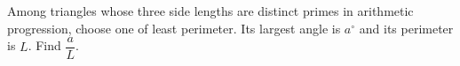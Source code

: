 Among triangles whose three side lengths are distinct primes in arithmetic progression, choose one of least perimeter. Its largest angle is $a^\circ$ and its perimeter is $L$. Find $\dfrac{a}{L}$.
